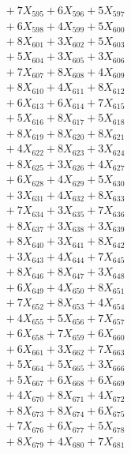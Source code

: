 \documentclass[a4paper,10pt]{article}
\begin{document}
{\begin{align}
&\;  + 7 X_{595} + 6 X_{596} + 5 X_{597} \\[0.3ex]
&\;  + 6 X_{598} + 4 X_{599} + 5 X_{600} \\[0.3ex]
&\;  + 8 X_{601} + 3 X_{602} + 5 X_{603} \\[0.3ex]
&\;  + 5 X_{604} + 3 X_{605} + 3 X_{606} \\[0.3ex]
&\;  + 7 X_{607} + 8 X_{608} + 4 X_{609} \\[0.5ex]\allowbreak
&\;  + 8 X_{610} + 4 X_{611} + 8 X_{612} \\[0.3ex]
&\;  + 6 X_{613} + 6 X_{614} + 7 X_{615} \\[0.3ex]
&\;  + 5 X_{616} + 8 X_{617} + 5 X_{618} \\[0.3ex]
&\;  + 8 X_{619} + 8 X_{620} + 8 X_{621} \\[0.3ex]
&\;  + 4 X_{622} + 8 X_{623} + 3 X_{624} \\[0.3ex]
&\;  + 8 X_{625} + 3 X_{626} + 4 X_{627} \\[0.3ex]
&\;  + 6 X_{628} + 4 X_{629} + 5 X_{630} \\[0.3ex]
&\;  + 3 X_{631} + 4 X_{632} + 8 X_{633} \\[0.3ex]
&\;  + 7 X_{634} + 3 X_{635} + 7 X_{636} \\[0.3ex]
&\;  + 8 X_{637} + 3 X_{638} + 3 X_{639} \\[0.5ex]\allowbreak
&\;  + 8 X_{640} + 3 X_{641} + 8 X_{642} \\[0.3ex]
&\;  + 3 X_{643} + 4 X_{644} + 7 X_{645} \\[0.3ex]
&\;  + 8 X_{646} + 8 X_{647} + 3 X_{648} \\[0.3ex]
&\;  + 6 X_{649} + 4 X_{650} + 8 X_{651} \\[0.3ex]
&\;  + 7 X_{652} + 8 X_{653} + 4 X_{654} \\[0.3ex]
&\;  + 4 X_{655} + 5 X_{656} + 7 X_{657} \\[0.3ex]
&\;  + 6 X_{658} + 7 X_{659} + 6 X_{660} \\[0.3ex]
&\;  + 6 X_{661} + 3 X_{662} + 7 X_{663} \\[0.3ex]
&\;  + 5 X_{664} + 5 X_{665} + 3 X_{666} \\[0.3ex]
&\;  + 5 X_{667} + 6 X_{668} + 6 X_{669} \\[0.5ex]\allowbreak
&\;  + 4 X_{670} + 8 X_{671} + 4 X_{672} \\[0.3ex]
&\;  + 8 X_{673} + 8 X_{674} + 6 X_{675} \\[0.3ex]
&\;  + 7 X_{676} + 6 X_{677} + 5 X_{678} \\[0.3ex]
&\;  + 8 X_{679} + 4 X_{680} + 7 X_{681} \\[0.3ex]

\end{align}}
\end{document}
